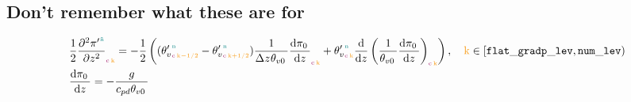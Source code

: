 \clearpage
\subsection{Don't remember what these are for}
\label{sub:misc}

\begin{align}
    &\exnerprimedzz{\ntilde}{\c}{\k} = - \frac{1}{2} \left( (\vpotempprime{\n}{\c}{\k-1/2} - \vpotempprime{\n}{\c}{\k+1/2}) \dexrefdz{\c}{\k} + \vpotempprime{\n}{\c}{\k} \ddexrefdzz{\c}{\k} \right), \quad \k \in [\nflatgradp, \nlev) \\
    &\ddz{\exnerref{}{}} = - \frac{g}{\cpd \vpotempref{}{}}
\end{align}
